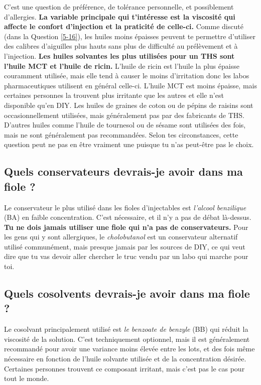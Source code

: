 \documentclass{article}
\begin{document}
C'est une question de préférence, de tolérance personnelle, et possiblement d'allergies. \textbf{La variable principale qui t'intéresse est la viscosité qui affecte le confort d'injection et la praticité de celle-ci.} Comme discuté (dans la Question \ref{5-16}), les huiles moins épaisses peuvent te permettre d'utiliser des calibres d'aiguilles plus hauts sans plus de difficulté au prélèvement et à l'injection. \textbf{Les huiles solvantes les plus utilisées pour un THS sont l'huile MCT et l'huile de ricin.} L'huile de ricin est l'huile la plus épaisse couramment utilisée, mais elle tend à causer le moins d'irritation donc les labos pharmaceutiques utilisent en général celle-ci. L'huile MCT est moins épaisse, mais certaines personnes la trouvent plus irritante que les autres et elle n'est disponible qu'en DIY. Les huiles de graines de coton ou de pépins de raisins sont occasionnellement utilisées, mais généralement pas par des fabricants de THS. D'autres huiles comme l'huile de tournesol ou de sésame sont utilisées des fois, mais ne sont généralement pas recommandées. Selon tes circonstances, cette question peut ne pas en être vraiment une puisque tu n'as peut-être pas le choix.

\subsection{Quels conservateurs devrais-je avoir dans ma fiole ?}\label{6-17}

Le conservateur le plus utilisé dans les fioles d'injectables est \textit{l'alcool benzilique} (BA) en faible concentration. C'est nécessaire, et il n'y a pas de débat là-dessus. \textbf{Tu ne dois jamais utiliser une fiole qui n'a pas de conservateurs.} Pour les gens qui y sont allergiques, le \textit{cholobutanol} est un conservateur alternatif utilisé communément, mais presque jamais par les sources de DIY, ce qui veut dire que tu vas devoir aller chercher le truc vendu par un labo qui marche pour toi. 

\subsection{Quels cosolvents devrais-je avoir dans ma fiole ?}

Le cosolvant principalement utilisé est \textit{le benzoate de benzyle} (BB) qui réduit la viscosité de la solution. C'est techniquement optionnel, mais il est généralement recommandé pour avoir une variance moins élevée entre les lots, et des fois même nécessaire en fonction de l'huile solvante utilisée et de la concentration désirée. Certaines personnes trouvent ce composant irritant, mais c'est pas le cas pour tout le monde.
 
\end{document}
